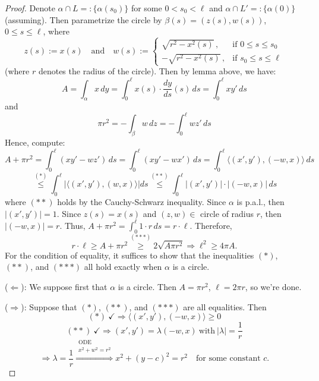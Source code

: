 \begin{proof}
\noindent Denote $\alpha\cap L =: \{\alpha(s_0)\}$ for some $0 < s_0 < \ell$ and $\alpha\cap L' =: \{\alpha(0)\}$ (assuming). Then parametrize the circle by $\beta(s) = (z(s), w(s))$, $0\le s\le \ell$, where
\[
z(s) := x(s) \quad\text{and}\quad w(s) := \begin{cases}\sqrt{r^2 - x^2(s)}\,, & \text{if } 0\le s\le s_0\\ -\sqrt{r^2 - x^2(s)}\,, & \text{if } s_0\le s\le \ell\end{cases}
\]
(where $r$ denotes the radius of the circle). Then by lemma above, we have:
\[
A = \int_\alpha x\,dy = \int_0^\ell x(s)\cdot\frac{dy}{ds}(s)\,ds = \int_0^\ell xy'\,ds
\]
and
\[
\pi r^2 = -\int_\beta w\,dz = -\int_0^\ell wz'\,ds
\]
Hence, compute:
\[
A + \pi r^2 = \int_0^\ell (xy' - wz')\,ds = \int_0^\ell (xy' - wx')\,ds = \int_0^\ell \langle (x', y'), (-w, x)\rangle\,ds
\]
\[
\stackrel{(*)}{\leq} \int_0^\ell \left|\langle (x', y'), (w, x)\rangle\right| ds \stackrel{(**)}{\leq} \int_0^\ell |(x', y')|\cdot|(-w, x)|\,ds
\]
where $(**)$ holds by the Cauchy-Schwarz inequality. Since $\alpha$ is p.a.l., then $|(x', y')| = 1$. Since $z(s) = x(s)$ and $(z, w)\in$ circle of radius $r$, then $|(-w, x)| = r$. Thus, $A + \pi r^2 = \int_0^\ell 1\cdot r\,ds = r\cdot\ell$. Therefore,
\[
r\cdot\ell \geq A + \pi r^2 \stackrel{(***)}{\geq} 2\sqrt{A\pi r^2} \Rightarrow \ell^2 \geq 4\pi A.
\]
For the condition of equality, it suffices to show that the inequalities $(*)$, $(**)$, and $(***)$ all hold exactly when $\alpha$ is a circle.

\noindent ($\Leftarrow$): We suppose first that $\alpha$ is a circle. Then $A = \pi r^2$, $\ell = 2\pi r$, so we're done.

\noindent ($\Rightarrow$): Suppose that $(*)$, $(**)$, and $(***)$ are all equalities. Then
\[
(*)\ \checkmark \Rightarrow \langle (x', y'), (-w, x)\rangle \geq 0
\]
\[
(**)\ \checkmark \Rightarrow (x', y') = \lambda(-w, x)\ \text{with}\ |\lambda| = \frac{1}{r}
\]
\[
\Rightarrow \lambda = \frac{1}{r} \stackrel{\substack{\text{ODE}\\ x^2+w^2=r^2}}{\Longrightarrow} x^2 + (y - c)^2 = r^2\quad\text{for some constant } c. 
\]
\end{proof}
